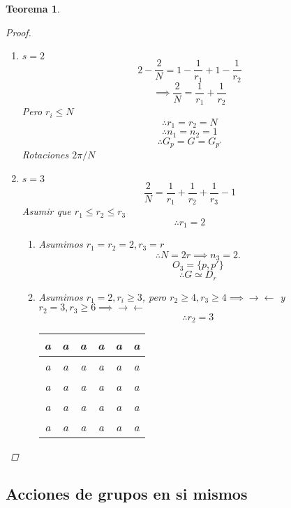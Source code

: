 \documentclass[11pt]{book}
\newcommand{\contr}{\rightarrow\leftarrow}
\newtheorem{thm}{Teorema}[section]
\theoremstyle{definition}
\begin{document}
\begin{thm}
\begin{proof}
\begin{enumerate}[label=(\arabic* órbitas):]
			\item $s=2$
			\[2-\frac{2}{N}=1-\frac{1}{r_1}+1-\frac{1}{r_2}\]
			\[\implies\frac{2}{N}=\frac{1}{r_1}+\frac{1}{r_2}\]
			Pero $r_i\leq N$
			\[\therefore r_1=r_2=N\]
			\[\therefore n_1=n_2=1\]
			\[\therefore G_p=G=G_{p'}\]
			Rotaciones $2\pi/N$

			\item $s=3$
			\[\frac{2}{N}=\frac{1}{r_1}+\frac{1}{r_2}+\frac{1}{r_3}-1\]
			Asumir que $r_1\leq r_2\leq r_3$
			\[\therefore r_1=2\]
			\begin{enumerate}[label=(\roman*)]
				\item Asumimos $r_1=r_2=2,r_3=r$
				\[\therefore N=2r\implies n_3=2.\]
				\[O_3=\{p,p'\}\]
				\[\therefore G\simeq D_r\]

				\item Asumimos $r_1=2,r_i\geq 3$, pero $r_2\geq 4, r_3\geq 4\implies \contr$ y $r_2=3, r_3\geq 6\implies \contr$
				\[\therefore r_2=3\]
				\begin{center}
					\begin{tabular}{ c | c | c | c | c | c }
						a & a & a & a & a & a \\ \hline
						a & a & a & a & a & a \\
						a & a & a & a & a & a \\
						a & a & a & a & a & a \\
						a & a & a & a & a & a
					\end{tabular}
				\end{center}
			\end{enumerate}
		\end{enumerate}
	\end{proof}
\end{thm}
\subsection{Acciones de grupos en si mismos}
\end{document}
